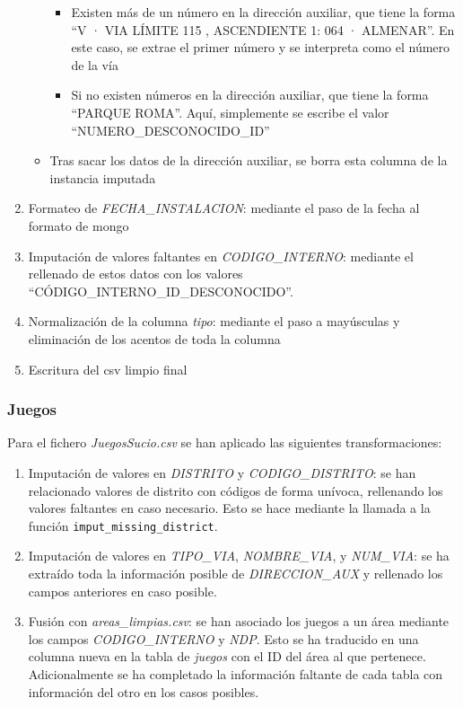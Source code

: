 \documentclass[]{article}
\begin{document}
\begin{enumerate}
\begin{itemize}
\begin{itemize}
            \item Existen más de un número en la dirección auxiliar, que tiene la forma ``V · VIA LÍMITE 115 , ASCENDIENTE 1: 064 · ALMENAR''. En este caso, se extrae el primer número y se interpreta como el número de la vía
            \item Si no existen números en la dirección auxiliar, que tiene la forma ``PARQUE ROMA''. Aquí, simplemente se escribe el valor ``NUMERO\_DESCONOCIDO\_ID''
        \end{itemize}
        \item Tras sacar los datos de la dirección auxiliar, se borra esta columna de la instancia imputada
    \end{itemize}
    \item Formateo de \textit{FECHA\_INSTALACION}: mediante el paso de la fecha al formato de mongo
    \item Imputación de valores faltantes en \textit{CODIGO\_INTERNO}: mediante el rellenado de estos datos con los valores ``CÓDIGO\_INTERNO\_ID\_DESCONOCIDO''.
    \item Normalización de la columna \textit{tipo}: mediante el paso a mayúsculas y eliminación de los acentos de toda la columna
    \item Escritura del csv limpio final
\end{enumerate}

\subsubsection{Juegos}
\label{subsubsec:preprocessjuego}
Para el fichero \textit{JuegosSucio.csv} se han aplicado las siguientes transformaciones:

\begin{enumerate}
    \item Imputación de valores en \textit{DISTRITO} y \textit{CODIGO\_DISTRITO}: se han relacionado valores de distrito con códigos de forma unívoca, rellenando los valores faltantes en caso necesario. Esto se hace mediante la llamada a la función \texttt{imput\_missing\_district}.
    \item Imputación de valores en \textit{TIPO\_VIA}, \textit{NOMBRE\_VIA}, y \textit{NUM\_VIA}: se ha extraído toda la información posible de \textit{DIRECCION\_AUX} y rellenado los campos anteriores en caso posible.
    \item Fusión con \textit{areas\_limpias.csv}: se han asociado los juegos a un área mediante los campos \textit{CODIGO\_INTERNO} y \textit{NDP}. Esto se ha traducido en una columna nueva en la tabla de \textit{juegos} con el ID del área al que pertenece. Adicionalmente se ha completado la información faltante de cada tabla con información del otro en los casos posibles.
\end{enumerate}
\end{document}
